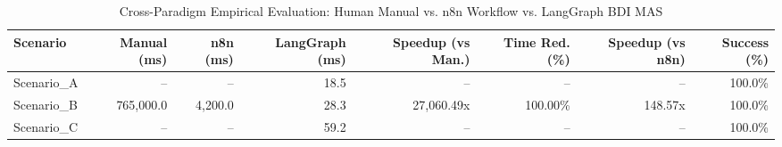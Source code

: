 \begin{table}[htbp]
\centering
\caption{Cross-Paradigm Empirical Evaluation: Human Manual vs. n8n Workflow vs. LangGraph BDI MAS}
\label{tab:empirical_evaluation}
\begin{tabular}{lrrrrrrr}
\toprule
\textbf{Scenario} & \textbf{Manual (ms)} & \textbf{n8n (ms)} & \textbf{LangGraph (ms)} & \textbf{Speedup (vs Man.)} & \textbf{Time Red. (\%)} & \textbf{Speedup (vs n8n)} & \textbf{Success (\%)} \\
\midrule
Scenario\_A & -- & -- & 18.5 & -- & -- & -- & 100.0\% \\
Scenario\_B & 765,000.0 & 4,200.0 & 28.3 & 27,060.49x & 100.00\% & 148.57x & 100.0\% \\
Scenario\_C & -- & -- & 59.2 & -- & -- & -- & 100.0\% \\
\bottomrule
\end{tabular}
\end{table}